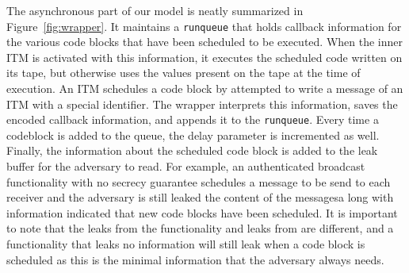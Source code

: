 The asynchronous part of our model is neatly summarized in Figure~\ref{fig:wrapper}.
It maintains a \texttt{runqueue} that holds callback information for the various code blocks that have been scheduled to be executed.
When the inner ITM is activated with this information, it executes the scheduled code written on its tape, but otherwise uses the values present on the tape at the time of execution.
An ITM schedules a code block by attempted to write a message of an ITM with a special identifier.
The wrapper interprets this information, saves the encoded callback information, and appends it to the \texttt{runqueue}.
Every time a codeblock is added to the queue, the delay parameter is incremented as well.
Finally, the information about the scheduled code block is added to the leak buffer for the adversary to read.
For example, an authenticated broadcast functionality with no secrecy guarantee schedules a message to be send to each receiver and the adversary is still leaked the content of the messagesa long with information indicated that new code blocks have been scheduled.
It is important to note that the leaks from the functionality and leaks from \fwrapper are different, and a functionality that leaks no information will still leak when a code block is scheduled as this is the minimal information that the adversary always needs.


